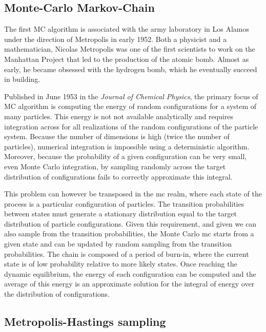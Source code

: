 \subsection{Monte-Carlo Markov-Chain}

The first \acrshort{MC} algorithm is associated with the army laboratory in Los Alamos under the direction of Metropolis in early 1952.
Both a physicist and a mathematician, Nicolas Metropolis was one of the first scientists to work on the Manhattan Project that led to the production of the atomic bomb.
Almost as early, he became obsessed with the hydrogen bomb, which he eventually succeed in building.

Published in June 1953 in the \textit{Journal of Chemical Physics}, the primary focus of \acrshort{MC} algorithm is computing the energy of random configurations for a system of many particles.
This energy is not not available analytically and requires integration across for all realizations of the random configurations of the particle system.
Because the number of dimensions is high (twice the number of particles), numerical integration is impossible using a deterministic algorithm.
Moreover, because the probability of a given configuration can be very small, even Monte Carlo integration, by sampling randomly across the target distribution of configurations fails to correctly approximate this integral.

This problem can however be transposed in the \gls{mc} realm, where each state of the process is a particular configuration of particles.
The {transition} probabilities between states must generate a stationary distribution equal to the target distribution of particle configurations.
Given this requirement, and given we can also sample from the {transition} probabilities, the Monte Carlo \gls{mc} starts from a given state and can be updated by random sampling from the {transition} probabilities.
The chain is composed of a period of burn-in, where the current state is of low probability relative to more likely states.
Once reaching the dynamic equilibrium, the energy of each configuration can be computed and the average of this energy is an approximate solution for the integral of energy over the distribution of configurations.

\subsection{Metropolis-Hastings sampling}


